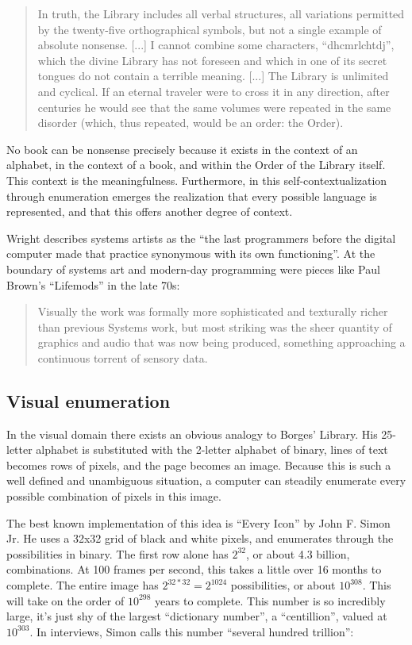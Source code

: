 \documentclass{thesis}
\begin{document}
	\begin{quote}
	In truth, the Library includes all verbal structures, all variations permitted by the twenty-five orthographical symbols, but not a single example of absolute nonsense. [...] I cannot combine some characters, ``dhcmrlchtdj'', which the divine Library has not foreseen and which in one of its secret tongues do not contain a terrible meaning. [...] The Library is unlimited and cyclical. If an eternal traveler were to cross it in any direction, after centuries he would see that the same volumes were repeated in the same disorder (which, thus repeated, would be an order: the Order).
	\end{quote}
	
	No book can be nonsense precisely because it exists in the context of an alphabet, in the context of a book, and within the Order of the Library itself. This context is the meaningfulness. Furthermore, in this self-contextualization through enumeration emerges the realization that every possible language is represented, and that this offers another degree of context.
	
	Wright\cite{Wright09} describes systems artists as the ``the last programmers before the digital computer made that practice synonymous with its own functioning''. At the boundary of systems art and modern-day programming were pieces like Paul Brown's ``Lifemods'' in the late 70s:
	
	\begin{quote}
	Visually the work was formally more sophisticated and texturally richer than previous Systems work, but most striking was the sheer quantity of graphics and audio that was now being produced, something approaching a continuous torrent of sensory data.
	\end{quote}
	
\subsection{Visual enumeration}
	In the visual domain there exists an obvious analogy to Borges' Library. His 25-letter alphabet is substituted with the 2-letter alphabet of binary, lines of text becomes rows of pixels, and the page becomes an image. Because this is such a well defined and unambiguous situation, a computer can steadily enumerate every possible combination of pixels in this image.
	
	The best known implementation of this idea is ``Every Icon'' by John F. Simon Jr.\cite{john_f._simon_jr._every_????} He uses a 32x32 grid of black and white pixels, and enumerates through the possibilities in binary. The first row alone has $2^{32}$, or about 4.3 billion, combinations. At 100 frames per second, this takes a little over 16 months to complete. The entire image has $2^{32*32}=2^{1024}$ possibilities, or about $10^{308}$. This will take on the order of $10^{298}$ years to complete. This number is so incredibly large, it's just shy of the largest ``dictionary number'', a ``centillion'', valued at $10^{303}$. In interviews, Simon calls this number ``several hundred trillion''\cite{matthew_mirapaul_in_1997}:
	
\end{document}
